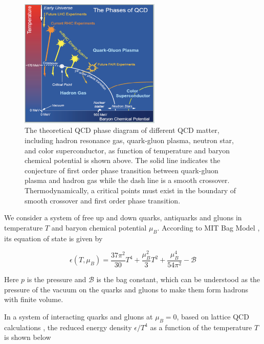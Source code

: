 \begin{figure}[hbtp]
\begin{center}
\includegraphics[width=0.60\textwidth]{Figures/Chapter1/QCDPhaseDiagram.png}
\caption{The theoretical QCD phase diagram of different QCD matter, including hadron resonance gas, quark-gluon plasma, neutron star, and color superconductor, as function of temperature and baryon chemical potential is shown above. The solid line indicates the conjecture of first order phase transition between quark-gluon plasma and hadron gas while the dash line is a smooth crossover. Thermodynamically, a critical points must exist in the boundary of smooth crossover and first order phase transition.}
\label{QCDPhaseDiagram}
\end{center}
\end{figure} 

We consider a system of free up and down quarks, antiquarks and gluons in temperature $T$ and baryon chemical potential $\mu_B$. According to MIT Bag Model \cite{MITBag}, its equation of state is given by

\begin{equation}
\epsilon(T,\mu_B) = \frac{37\pi^2}{30} T^4 + \frac{\mu_B^2}{3}T^2 + \frac{\mu_B^4}{54\pi^2} -  \mathcal{B}
\end{equation}

Here $p$ is the pressure and $\mathcal{B}$ is the bag constant, which can be understood as the pressure of the vacuum on the quarks and gluons to make them form hadrons with finite volume.

In a system of interacting quarks and gluons at $\mu_B=0$, based on lattice QCD calculations \cite{LatticeQGP}, the reduced energy density $\epsilon/T^4$ as a function of the temperature $T$ is shown below


